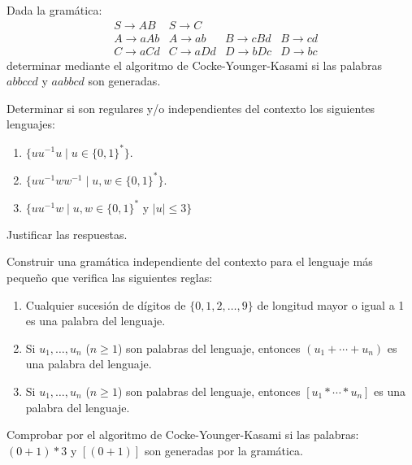 \begin{ejercicio}\label{ej:1.6.8}
    Dada la gramática:
    \begin{equation*}
        \begin{array}{llll}
            &S\rightarrow AB &S\rightarrow C & & \\
            &A\rightarrow aAb &A\rightarrow ab &B\rightarrow cBd &B\rightarrow cd \\
            &C\rightarrow aCd &C\rightarrow aDd &D\rightarrow bDc &D\rightarrow bc
        \end{array}
    \end{equation*}
    determinar mediante el algoritmo de Cocke-Younger-Kasami si las palabras $abbccd$ y $aabbcd$ son generadas.
\end{ejercicio}

\begin{ejercicio}\label{ej:1.6.9}
    Determinar si son regulares y/o independientes del contexto los siguientes lenguajes:
    \begin{enumerate}[label=\alph*)]
        \item $\{uu^{-1}u \mid u\in {\{0,1\}}^{\ast}\}$.
        \item $\{uu^{-1}ww^{-1}\mid u,w\in {\{0,1\}}^{\ast}\}$.
        \item $\{uu^{-1}w \mid u,w\in {\{0,1\}}^{\ast} \text{\ y\ } |u|\leq 3\}$
    \end{enumerate}
    Justificar las respuestas.
\end{ejercicio}

\begin{ejercicio}\label{ej:1.6.10}
    Construir una gramática independiente del contexto para el lenguaje más pequeño que verifica las siguientes reglas:
    \begin{enumerate}[label=\alph*)]
        \item Cualquier sucesión de dígitos de $\{0,1,2,\ldots, 9\}$ de longitud mayor o igual a 1 es una palabra del lenguaje.
        \item Si $u_1,\ldots,u_n$ ($n\geq 1$) son palabras del lenguaje, entonces $(u_1+\cdots + u_n)$ es una palabra del lenguaje.
        \item Si $u_1,\ldots,u_n$ ($n\geq 1$) son palabras del lenguaje, entonces $[u_1 \ast \cdots \ast u_n]$ es una palabra del lenguaje.
    \end{enumerate}
    Comprobar por el algoritmo de Cocke-Younger-Kasami si las palabras: $(0+1)*3$ y $[(0+1)]$ son generadas por la gramática.
\end{ejercicio}

